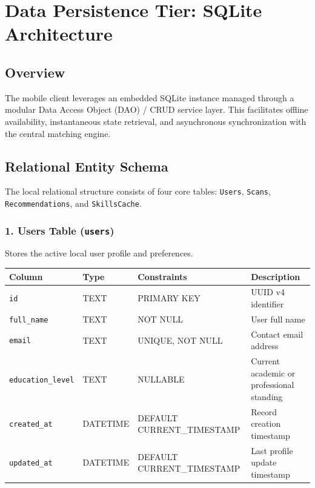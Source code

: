 \section{Data Persistence Tier: SQLite Architecture}
\subsection{Overview}
The mobile client leverages an embedded SQLite instance managed through a modular Data Access Object (DAO) / CRUD service layer. This facilitates offline availability, instantaneous state retrieval, and asynchronous synchronization with the central matching engine.

\subsection{Relational Entity Schema}
The local relational structure consists of four core tables: \texttt{Users}, \texttt{Scans}, \texttt{Recommendations}, and \texttt{SkillsCache}.

\subsubsection{1. Users Table (\texttt{users})}
Stores the active local user profile and preferences.
\begin{center}
\begin{tabular}{@{}llll@{}}
\toprule
\textbf{Column} & \textbf{Type} & \textbf{Constraints} & \textbf{Description} \\ \midrule
\texttt{id} & TEXT & PRIMARY KEY & UUID v4 identifier \\
\texttt{full\_name} & TEXT & NOT NULL & User full name \\
\texttt{email} & TEXT & UNIQUE, NOT NULL & Contact email address \\
\texttt{education\_level} & TEXT & NULLABLE & Current academic or professional standing \\
\texttt{created\_at} & DATETIME & DEFAULT CURRENT\_TIMESTAMP & Record creation timestamp \\
\texttt{updated\_at} & DATETIME & DEFAULT CURRENT\_TIMESTAMP & Last profile update timestamp \\ \bottomrule
\end{tabular}
\end{center}

